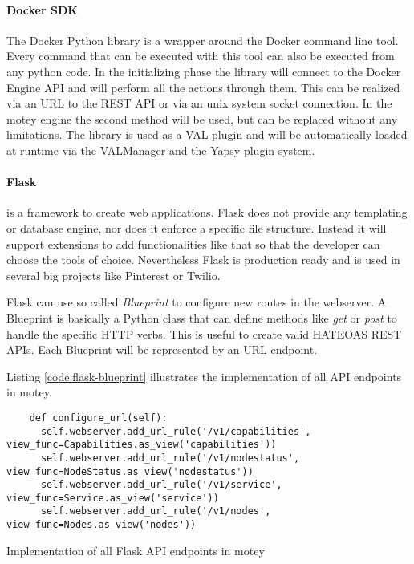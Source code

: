 \paragraph{Docker \ac{SDK}}
The Docker Python library is a wrapper around the Docker command line tool.
Every command that can be executed with this tool can also be executed from any python code.
In the initializing phase the library will connect to the Docker Engine \ac{API} and will perform all the actions through them.
This can be realized via an \ac{URL} to the \ac{REST} \ac{API} or via an unix system socket connection.
In the motey engine the second method will be used, but can be replaced without any limitations.
The library is used as a \ac{VAL} plugin and will be automatically loaded at runtime via the VALManager and the Yapsy plugin system.

\paragraph{Flask} is a framework to create web applications.
Flask does not provide any templating or database engine, nor does it enforce a specific file structure.
Instead it will support extensions to add functionalities like that so that the developer can choose the tools of choice.\autocite[cf.]{Flask:Documentation:Foreword}
Nevertheless Flask is production ready and is used in several big projects like Pinterest\autocite{Quora:Pinterest:Flask} or Twilio\autocite{Twilio:Flask}.

Flask can use so called \textit{Blueprint} to configure new routes in the webserver.
A Blueprint is basically a Python class that can define methods like \textit{get} or \textit{post} to handle the specific \ac{HTTP} verbs.
This is useful to create valid \ac{HATEOAS} \ac{REST} \acp{API}.
Each Blueprint will be represented by an \ac{URL} endpoint.

Listing \ref{code:flask-blueprint} illustrates the implementation of all \ac{API} endpoints in motey.
\begin{listing}[H]
  \begin{verbatim}
    def configure_url(self):
      self.webserver.add_url_rule('/v1/capabilities', view_func=Capabilities.as_view('capabilities'))
      self.webserver.add_url_rule('/v1/nodestatus', view_func=NodeStatus.as_view('nodestatus'))
      self.webserver.add_url_rule('/v1/service', view_func=Service.as_view('service'))
      self.webserver.add_url_rule('/v1/nodes', view_func=Nodes.as_view('nodes'))
  \end{verbatim}
  \caption{Implementation of all Flask \ac{API} endpoints in motey}
  \label{code:flask-blueprint}
\end{listing}

